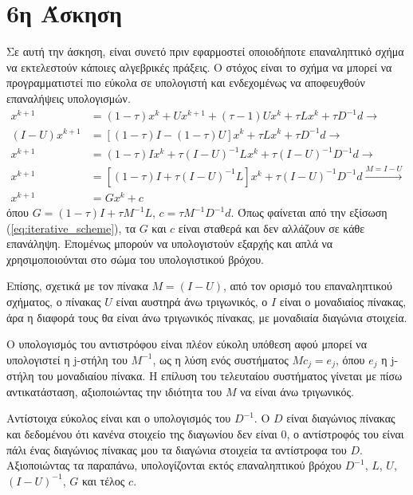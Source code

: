 \documentclass[assignment2.tex]{subfiles}
\begin{document}
\section*{6η Άσκηση}
Σε αυτή την άσκηση, είναι συνετό πριν εφαρμοστεί οποιοδήποτε επαναληπτικό σχήμα να εκτελεστούν κάποιες αλγεβρικές πράξεις. Ο στόχος είναι το σχήμα να μπορεί να προγραμματιστεί πιο εύκολα σε υπολογιστή και ενδεχομένως να αποφευχθούν επαναλήψεις υπολογισμών.
\begin{equation}
\begin{split}
x^{k+1} &= (1-\tau)x^k + Ux^{k+1}+(\tau-1)Ux^k + \tau Lx^k + \tau D^{-1}d \rightarrow \\
(I-U)x^{k+1} &= \left[(1-\tau)I - (1-\tau)U\right]x^k +\tau Lx^k + \tau D^{-1}d \rightarrow \\
x^{k+1} &= (1-\tau)Ix^k + \tau (I-U)^{-1}Lx^k + \tau (I-U)^{-1}D^{-1}d \rightarrow \\
x^{k+1} &= \left[(1-\tau)I + \tau (I-U)^{-1}L\right]x^k + \tau (I-U)^{-1}D^{-1}d \xrightarrow{M=I-U}\\
x^{k+1} &= G x^k + c
\end{split}
\label{eq:iterative_scheme}
\end{equation}
όπου $G=(1-\tau)I + \tau M^{-1}L$, $c=\tau M^{-1}D^{-1}d$. Όπως φαίνεται από την εξίσωση (\ref{eq:iterative_scheme}), τα $G$ και $c$ είναι σταθερά και δεν αλλάζουν σε κάθε επανάληψη. Επομένως μπορούν να υπολογιστούν εξαρχής και απλά να χρησιμοποιούνται στο σώμα του υπολογιστικού βρόχου.

Επίσης, σχετικά με τον πίνακα $M=(I-U)$, από τον ορισμό του επαναληπτικού σχήματος, ο πίνακας $U$ είναι αυστηρά άνω τριγωνικός, ο $I$ είναι ο μοναδιαίος πίνακας, άρα η διαφορά τους θα είναι άνω τριγωνικός πίνακας, με μοναδιαία διαγώνια στοιχεία.

Ο υπολογισμός του αντιστρόφου είναι πλέον εύκολη υπόθεση αφού μπορεί να υπολογιστεί η \textlatin{j}-στήλη του $M^{-1}$, ως η λύση ενός συστήματος $M c_j = e_j$, όπου $e_j$ η \textlatin{j}-στήλη του μοναδιαίου πίνακα. Η επίλυση του τελευταίου συστήματος γίνεται με πίσω αντικατάσταση, αξιοποιώντας την ιδιότητα του $M$ να είναι άνω τριγωνικός.

Αντίστοιχα εύκολος είναι και ο υπολογισμός του $D^{-1}$. Ο $D$ είναι διαγώνιος πίνακας και δεδομένου ότι κανένα στοιχείο της διαγωνίου δεν είναι 0, ο αντίστροφός του είναι πάλι ένας διαγώνιος πίνακας μου τα διαγώνια στοιχεία τα αντίστροφα του $D$. Αξιοποιώντας τα παραπάνω, υπολογίζονται εκτός επαναληπτικού βρόχου $D^{-1}$, $L$, $U$, $(I-U)^{-1}$, $G$ και τέλος $c$.
\end{document}
